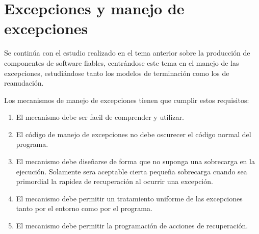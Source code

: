 \section{Excepciones y manejo de excepciones}

Se continúa con el estudio realizado en el tema anterior sobre la producción de
componentes de software fiables, centrándose este tema en el manejo de las
excepciones, estudiándose tanto los modelos de terminación como los de
reanudación.

Los mecanismos de manejo de excepciones tienen que cumplir estos requisitos:

\begin{enumerate}
	\item El mecanismo debe ser facil de comprender y utilizar.
	\item El código de manejo de excepciones no debe oscurecer el código
normal del programa.
	\item El mecanismo debe diseñarse de forma que no suponga una sobrecarga
en la ejecución. Solamente sera aceptable cierta pequeña sobrecarga cuando sea
primordial la rapidez de recuperación al ocurrir una excepción.
	\item El mecanismo debe permitir un tratamiento uniforme de las
excepciones tanto por el entorno como por el programa.
	\item El mecanismo debe permitir la programación de acciones de
recuperación.
\end{enumerate}

